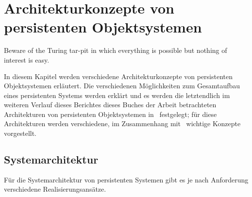 %
\chapter{Architekturkonzepte von persistenten Objektsystemen}%
\label{chap:arch}
%
\begin{fortune}
Beware of the Turing tar-pit in which everything is possible but
nothing of interest is easy.
\end{fortune}
%
In diesem Kapitel werden verschiedene Architekturkonzepte von
persistenten Objektsystemen er\-l\"{a}u\-tert. Die verschiedenen
M\"{o}glichkeiten zum Gesamtaufbau eines persistenten Systems werden
erkl\"{a}rt und es werden die letztendlich im weiteren Verlauf
\ifbericht dieses Berichtes \else\ifbuch dieses Buches \else der
Arbeit \fi\fi betrachteten Architekturen von persistenten
Objektsystemen in \clos\ festgelegt; f\"{u}r diese Architekturen
werden verschiedene, im Zusammenhang mit \cl\ wichtige Konzepte
vorgestellt.
%
\section{Systemarchitektur}
%
F\"{u}r die Systemarchitektur von persistenten Systemen gibt es je nach
Anforderung verschiedene Realisierungsans\"{a}tze.
%
